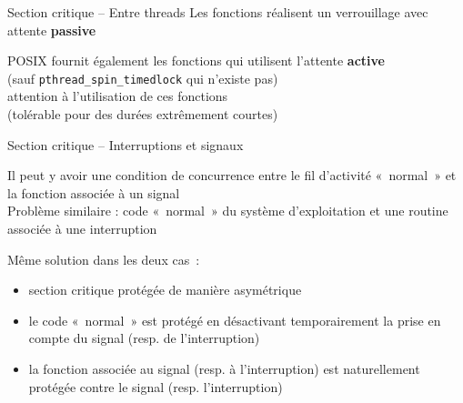 \begin {frame} {Section critique -- Entre threads}
    Les fonctions  réalisent un verrouillage
    avec attente \textbf {passive}

    \vspace* {3mm}

    POSIX fournit également les fonctions 
    qui utilisent l'attente \textbf {active}
    \\
    (sauf \texttt {\small pthread\_spin\_timedlock} qui n'existe pas)
    \\
    \implique attention à l'utilisation de ces fonctions \\
    (tolérable pour des durées extrêmement courtes)

\end {frame}

\begin {frame} {Section critique -- Interruptions et signaux}

    Il peut y avoir une condition de concurrence entre le fil d'activité
    «~normal~» et la fonction associée à un signal
    \\
    Problème similaire : code «~normal~» du système d'exploitation et une
    routine associée à une interruption

    \vspace* {3mm}

    Même solution dans les deux cas~:

    \begin {itemize}
	\item section critique protégée de manière asymétrique

	\item le code «~normal~» est protégé en désactivant
	    temporairement la prise en compte du signal (resp. de
	    l'interruption)

	\item la fonction associée au signal (resp. à l'interruption)
	    est naturellement protégée contre le signal
	    (resp. l'interruption)

    \end {itemize}

\end {frame}

